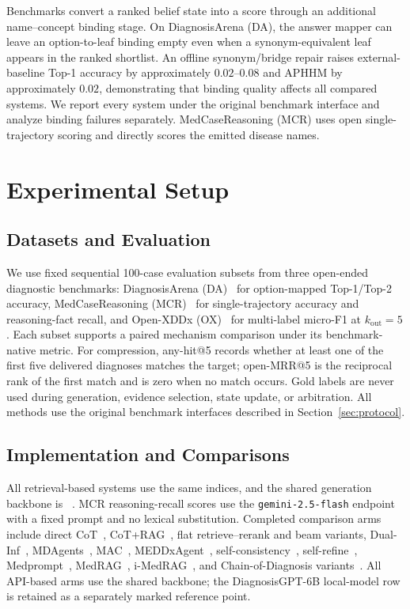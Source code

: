 \documentclass[letterpaper]{article} %
\begin{document}
Benchmarks convert a ranked belief state into a score through an additional name--concept binding stage.
On DiagnosisArena (DA), the answer mapper can leave an option-to-leaf binding empty even when a synonym-equivalent leaf appears in the ranked shortlist.
An offline synonym/bridge repair raises external-baseline Top-1 accuracy by approximately $0.02$--$0.08$ and APHHM by approximately $0.02$, demonstrating that binding quality affects all compared systems.
We report every system under the original benchmark interface and analyze binding failures separately.
MedCaseReasoning (MCR) uses open single-trajectory scoring and directly scores the emitted disease names.

\section{Experimental Setup}
\label{sec:experiments}

\subsection{Datasets and Evaluation}
\label{sec:data}

We use fixed sequential 100-case evaluation subsets from three open-ended diagnostic benchmarks:
DiagnosisArena (DA)~\cite{diagnosisarena} for option-mapped Top-1/Top-2 accuracy,
MedCaseReasoning (MCR)~\cite{medcasereasoning} for single-trajectory accuracy and reasoning-fact recall, and
Open-XDDx (OX)~\cite{dualinf2025} for multi-label micro-F1 at $k_{\mathrm{out}}{=}5$.
Each subset supports a paired mechanism comparison under its benchmark-native metric.
For compression, any-hit@5 records whether at least one of the first five delivered diagnoses matches the target; open-MRR@5 is the reciprocal rank of the first match and is zero when no match occurs.
Gold labels are never used during generation, evidence selection, state update, or arbitration.
All methods use the original benchmark interfaces described in Section~\ref{sec:protocol}.

\subsection{Implementation and Comparisons}
\label{sec:backbone}
\label{sec:baselines}

All retrieval-based systems use the same indices, and the shared generation backbone is ~\cite{llama33}.
MCR reasoning-recall scores use the \texttt{gemini-2.5-flash} endpoint~\cite{gemini25flash} with a fixed prompt and no lexical substitution.
Completed comparison arms include direct CoT~\cite{wei2022cot}, CoT+RAG~\cite{lewis2020rag,xiong2024medrag}, flat retrieve--rerank and beam variants, Dual-Inf~\cite{dualinf2025}, MDAgents~\cite{mdagents}, MAC~\cite{chen2025mac,mac2026}, MEDDxAgent~\cite{meddxagent2025}, self-consistency~\cite{wang2023selfconsistency}, self-refine~\cite{madaan2023selfrefine}, Medprompt~\cite{medprompt}, MedRAG~\cite{medrag}, i-MedRAG~\cite{imedrag}, and Chain-of-Diagnosis variants~\cite{chainofdiagnosis}.
All API-based arms use the shared backbone; the DiagnosisGPT-6B local-model row is retained as a separately marked reference point.
\end{document}
